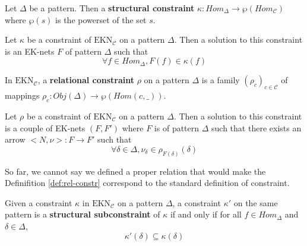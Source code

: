 \begin{defn}
    Let $\Delta$ be a pattern. Then a \textbf{structural constraint} $\kappa :Hom_\Delta \rightarrow \wp(Hom_\mathcal{C})$  where $\wp(s)$ is the powerset of the set $s$\label{nomencl:pow-set}.
\end{defn}

\begin{defn}
    \label{def:struct-constr}
    Let $\kappa$ be a constraint of $\text{EKN}_\mathcal{C}$ on a pattern $\Delta$. Then a solution to this constraint is an EK-nets $F$ of pattern $\Delta$ such that
    $$ \forall f \in Hom_\Delta, F(f)\in \kappa(f)$$
\end{defn}

\begin{defn}
    In $\text{EKN}_\mathcal{C}$, a \textbf{relational constraint} $\rho$ on a pattern $\Delta$ is a family
    $(\rho_c)_{c\in\mathcal{C}}$
    of mappings $\rho_c : Obj(\Delta) \rightarrow \wp(Hom(c,\_))$.
\end{defn}


\begin{defn}
    \label{def:rel-constr}
    Let $\rho$ be a constraint of $\text{EKN}_\mathcal{C}$ on a pattern $\Delta$. Then a solution to this constraint is a couple of EK-nets $(F,F')$ where $F$ is of pattern $\Delta$ such that there exists an arrow $\big<N,\nu\big> : F\rightarrow F'$ such that
    $$\forall \delta \in \Delta, \nu_\delta \in \rho_{F(\delta)}(\delta)$$
\end{defn}

\begin{rem}
    So far, we cannot say we defined a proper relation that would make the Definifition \ref{def:rel-constr} correspond to the standard definition of constraint.
\end{rem}


\begin{defn}
    Given a constraint $\kappa$ in $\text{EKN}_\mathcal{C}$ on a pattern $\Delta$, a constraint $\kappa'$ on the same pattern is a \textbf{structural subconstraint} of $\kappa$ if and only if for all $f\in Hom_\Delta$ and $\delta\in\Delta$,
    $$\kappa'(\delta)\subseteq\kappa(\delta)$$
\end{defn}


